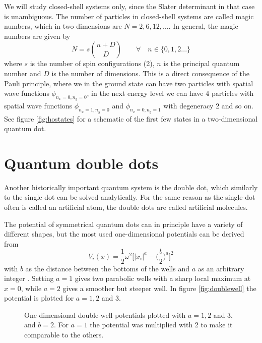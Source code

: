 We will study closed-shell systems only, since the Slater determinant in that case is unambiguous. \iffalse For open shells, the total Slater determinant is a linear combination of all the possible Slater determinants, and one can for instance use . \fi The number of particles in closed-shell systems are called magic numbers, which in two dimensions are $N=2,6,12,\hdots$. In general, the magic numbers are given by
\begin{equation}
N=s\binom{n+D}{D} \quad\quad\forall\quad n\in\{0,1,2...\}
\label{eq:HOclosedshell}
\end{equation}
where $s$ is the number of spin configurations (2), $n$ is the principal quantum number and $D$ is the number of dimensions. This is a direct consequence of the Pauli principle, where we in the ground state can have two particles with spatial wave functions $\phi_{n_x=0,n_y=0}$, in the next energy level we can have 4 particles with spatial wave functions $\phi_{n_x=1,n_y=0}$ and $\phi_{n_x=0,n_y=1}$ with degeneracy 2 and so on. See figure \eqref{fig:hostates} for a schematic of the first few states in a two-dimensional quantum dot. 


%

\section{Quantum double dots} \label{sec:doubledots}
Another historically important quantum system is the double dot, which similarly to the single dot can be solved analytically. For the same reason as the single dot often is called an artificial atom, the double dots are called artificial molecules. 

The potential of symmetrical quantum dots can in principle have a variety of different shapes, but the most used one-dimensional potentials can be derived from
\begin{equation}
V_i(x)=\frac{1}{2}\omega^2\bigg[|x_i|^a-\Big(\frac{b}{2}\Big)^a\bigg]^2
\label{eq:doublewell}
\end{equation}
with $b$ as the distance between the bottoms of the wells and $a$ as an arbitrary integer \cite{jelic_double_2012}. Setting $a=1$ gives two parabolic wells with a sharp local maximum at $x=0$, while $a=2$ gives a smoother but steeper well. In figure \eqref{fig:doublewell} the potential is plotted for $a=1,2$ and $3$.

\begin{figure}
	\centering
	
	\caption{One-dimensional double-well potentials plotted with $a=1,2$ and 3, and $b=2$. For $a=1$ the potential was multiplied with 2 to make it comparable to the others. }
	\label{fig:doublewell}
\end{figure}

